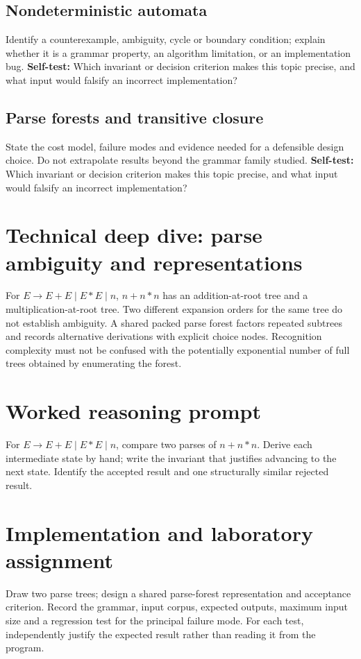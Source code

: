 \documentclass[11pt,letterpaper]{article}
\begin{document}
\subsection{Nondeterministic automata}
Identify a counterexample, ambiguity, cycle or boundary condition; explain whether it is a grammar property, an algorithm limitation, or an implementation bug.
\textbf{Self-test:} Which invariant or decision criterion makes this topic precise, and what input would falsify an incorrect implementation?
\subsection{Parse forests and transitive closure}
State the cost model, failure modes and evidence needed for a defensible design choice. Do not extrapolate results beyond the grammar family studied.
\textbf{Self-test:} Which invariant or decision criterion makes this topic precise, and what input would falsify an incorrect implementation?
\section{Technical deep dive: parse ambiguity and representations}
For $E\to E+E\mid E*E\mid n$, $n+n*n$ has an addition-at-root tree and a multiplication-at-root tree. Two different expansion orders for the same tree do not establish ambiguity. A shared packed parse forest factors repeated subtrees and records alternative derivations with explicit choice nodes. Recognition complexity must not be confused with the potentially exponential number of full trees obtained by enumerating the forest.
\section{Worked reasoning prompt}
For $E\to E+E\mid E*E\mid n$, compare two parses of $n+n*n$. Derive each intermediate state by hand; write the invariant that justifies advancing to the next state. Identify the accepted result and one structurally similar rejected result.
\section{Implementation and laboratory assignment}
Draw two parse trees; design a shared parse-forest representation and acceptance criterion. Record the grammar, input corpus, expected outputs, maximum input size and a regression test for the principal failure mode. For each test, independently justify the expected result rather than reading it from the program.
\end{document}
